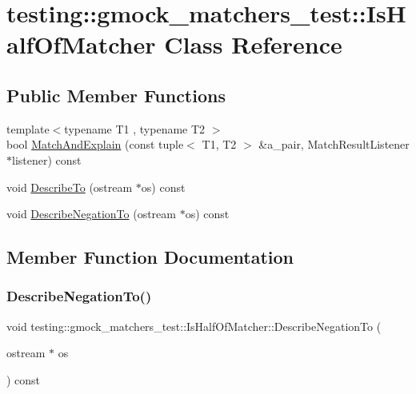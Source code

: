 \hypertarget{classtesting_1_1gmock__matchers__test_1_1IsHalfOfMatcher}{}\section{testing\+::gmock\+\_\+matchers\+\_\+test\+::Is\+Half\+Of\+Matcher Class Reference}
\label{classtesting_1_1gmock__matchers__test_1_1IsHalfOfMatcher}
\subsection*{Public Member Functions}
\begin{DoxyCompactItemize}
\item 
{\footnotesize template$<$typename T1 , typename T2 $>$ }\\bool \mbox{\hyperlink{classtesting_1_1gmock__matchers__test_1_1IsHalfOfMatcher_a8c919d71f6f7e05ac76c67f37107808c}{Match\+And\+Explain}} (const tuple$<$ T1, T2 $>$ \&a\+\_\+pair, Match\+Result\+Listener $\ast$listener) const
\item 
void \mbox{\hyperlink{classtesting_1_1gmock__matchers__test_1_1IsHalfOfMatcher_aaf62b9984288cc339599286352d82e91}{Describe\+To}} (ostream $\ast$os) const
\item 
void \mbox{\hyperlink{classtesting_1_1gmock__matchers__test_1_1IsHalfOfMatcher_a759ba45c89acfa77a4e1afe95e7b768d}{Describe\+Negation\+To}} (ostream $\ast$os) const
\end{DoxyCompactItemize}


\subsection{Member Function Documentation}
\mbox{\label{classtesting_1_1gmock__matchers__test_1_1IsHalfOfMatcher_a759ba45c89acfa77a4e1afe95e7b768d}} 
\subsubsection{\texorpdfstring{DescribeNegationTo()}{DescribeNegationTo()}}
{\footnotesize\ttfamily void testing\+::gmock\+\_\+matchers\+\_\+test\+::\+Is\+Half\+Of\+Matcher\+::\+Describe\+Negation\+To (\begin{DoxyParamCaption}\item[{ostream $\ast$}]{os }\end{DoxyParamCaption}) const\hspace{0.3cm}{\ttfamily [inline]}}

